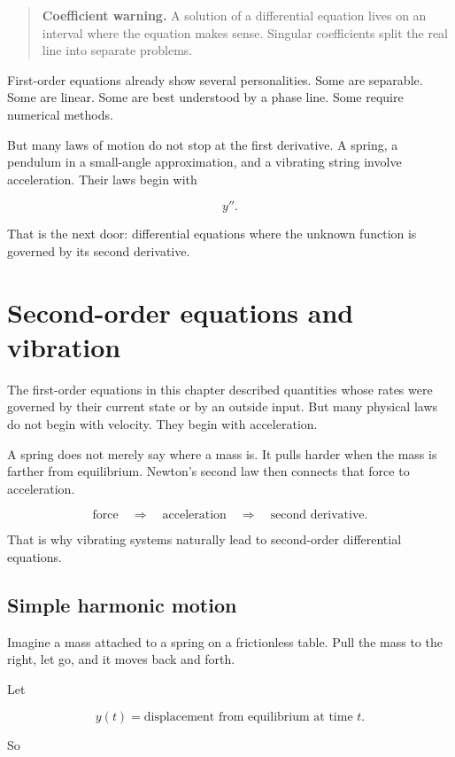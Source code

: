\begin{quote}
\textbf{Coefficient warning.}
A solution of a differential equation lives on an interval where the equation makes
sense.  Singular coefficients split the real line into separate problems.
\end{quote}

First-order equations already show several personalities.  Some are separable.  Some
are linear.  Some are best understood by a phase line.  Some require numerical methods.

But many laws of motion do not stop at the first derivative.  A spring, a pendulum in a
small-angle approximation, and a vibrating string involve acceleration.  Their laws begin
with

\[
y''.
\]

That is the next door: differential equations where the unknown function is governed by
its second derivative.
\section{Second-order equations and vibration}
\label{sec:second-order-equations-vibration}

The first-order equations in this chapter described quantities whose rates were governed
by their current state or by an outside input.  But many physical laws do not begin with
velocity.  They begin with acceleration.

A spring does not merely say where a mass is.  It pulls harder when the mass is farther
from equilibrium.  Newton's second law then connects that force to acceleration.

\[
\text{force}
\quad\Longrightarrow\quad
\text{acceleration}
\quad\Longrightarrow\quad
\text{second derivative}.
\]

That is why vibrating systems naturally lead to second-order differential equations.

\subsection{Simple harmonic motion}
\label{subsec:simple-harmonic-motion}

Imagine a mass attached to a spring on a frictionless table.  Pull the mass to the right,
let go, and it moves back and forth.

Let

\[
y(t)=\text{displacement from equilibrium at time }t.
\]

So

